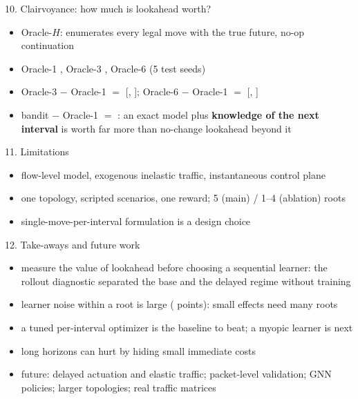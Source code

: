 \documentclass[aspectratio=169,10pt]{beamer}
\newcommand{\hl}[1]{\textcolor[HTML]{2A78D6}{\textbf{#1}}}
\begin{document}
\begin{frame}{10. Clairvoyance: how much is lookahead worth?}
\begin{itemize}
\item Oracle-$H$: enumerates every legal move with the true future, no-op continuation
\item Oracle-1 \LadderOraclehOne, Oracle-3 \LadderOraclehThree, Oracle-6 \LadderOraclehSix{} (5 test seeds)
\item Oracle-3 $-$ Oracle-1 $=$ \OracleThreeMinusOne{} [\OracleThreeMinusOneLo, \OracleThreeMinusOneHi];
  Oracle-6 $-$ Oracle-1 $=$ \OracleSixMinusOne{} [\OracleSixMinusOneLo, \OracleSixMinusOneHi]
\item bandit $-$ Oracle-1 $=$ \BanditMinusOracleOne{}: an exact model plus \hl{knowledge of the next interval} is worth
  far more than no-change lookahead beyond it
\end{itemize}
\end{frame}

\begin{frame}{11. Limitations}
\begin{itemize}
\item flow-level model, exogenous inelastic traffic, instantaneous control plane
\item one topology, scripted scenarios, one reward; 5 (main) / 1--4 (ablation) roots
\item single-move-per-interval formulation is a design choice
\end{itemize}
\end{frame}

\begin{frame}{12. Take-aways and future work}
\begin{itemize}
\item measure the value of lookahead before choosing a sequential learner: the rollout diagnostic separated the base and the delayed regime without training
\item learner noise within a root is large (\NoiseBanditSpread{} points): small effects need many roots
\item a tuned per-interval optimizer is the baseline to beat; a myopic learner is next
\item long horizons can hurt by hiding small immediate costs
\item future: delayed actuation and elastic traffic; packet-level validation; GNN policies;
  larger topologies; real traffic matrices
\end{itemize}
\end{frame}
\end{document}
